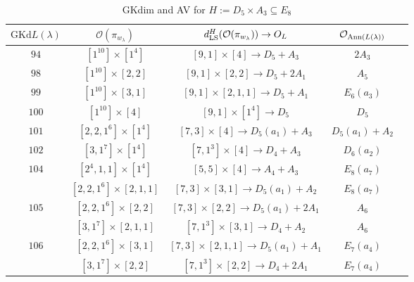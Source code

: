 \documentclass[reqno,12pt]{amsart}
\numberwithin{equation}{section}
\theoremstyle{plain}
\theoremstyle{definition}
\newcommand{\lam}{\lambda}
\renewcommand{\subset}{\subseteq}
\begin{document}
\begin{table}[htbp]\caption{ GKdim and AV for $H:=D_5\times A_3\subset E_8$}
	\label{tabd5a3}
	\centering
	\renewcommand{\arraystretch}{1.5}
	\setlength\tabcolsep{5pt}
	
	\begin{tabular}{|c|c|c|c|c|}
		\hline $\mathrm{GKd} L(\lambda)$ &     $\mathcal{O}({\pi_{w_{\lam}}})$& $d_{\rm LS}^{H}(\mathcal{O}(\pi_{w_\lambda}))\rightarrow    O_{L}$ & $\mathcal{O}_{{\rm Ann}(L(\lambda))}$ \\ \hline
		 $ 94 $    &  $ [1^{10}]\times [1^4]$  &  $ [9,1]\times [4] \rightarrow D_5+A_3$     &   $ 2A_3$      \\ \hline
	$ 98 $    &  $ [1^{10}]\times [2,2]$  &  $ [9,1]\times [2,2] \rightarrow D_5+2A_1$     &   $ A_5$      \\ \hline
  $ 99 $    &  $ [1^{10}]\times [3,1]$  &  $ [9,1]\times [2,1,1] \rightarrow D_5+A_1$     &   $ E_6(a_3)$      \\ \hline
  $ 100 $    &  $ [1^{10}]\times [4]$  &  $ [9,1]\times [1^4] \rightarrow D_5$     &   $ D_5$      \\ \hline

  $ 101 $    &  $ [2,2,1^{6}]\times [1^4]$  &  $ [7,3]\times [4] \rightarrow D_5(a_1)+A_3$     &   $ D_5(a_1)+A_2$      \\ \hline
  
  $ 102$    &  $ [3,1^7]\times [1^4] $  &$[7,1^3]\times [4]\rightarrow      D_4+A_3 $  &   $D_6(a_2) $        \\ \hline

$ 104$    &  $ [2^4,1,1]\times [1^4] $  & $[5,5]\times [4]\rightarrow      A_4+A_3 $  &   $E_8(a_7) $        \\
&  $ [2,2,1^6]\times [2,1,1] $  & $[7,3]\times [3,1]\rightarrow      D_5(a_1)+A_2$  &   $E_8(a_7) $        \\
\hline
$ 105$    &  $ [2,2,1^6]\times [2,2] $  & $[7,3]\times [2,2]\rightarrow      D_5(a_1)+2A_1$  &   $A_6 $        \\
&  $ [3,1^7]\times [2,1,1] $  & $[7,1^3]\times [3,1]\rightarrow      D_4+A_2 $  &   $A_6 $        \\
\hline

$ 106$    &  $ [2,2,1^6]\times [3,1] $  & $[7,3]\times [2,1,1]\rightarrow      D_5(a_1)+A_1$  &   $E_7(a_4) $        \\
&  $ [3,1^7]\times [2,2] $  & $[7,1^3]\times [2,2]\rightarrow      D_4+2A_1 $  &   $E_7(a_4) $        \\
\hline


\end{tabular}
\end{table}
\end{document}

